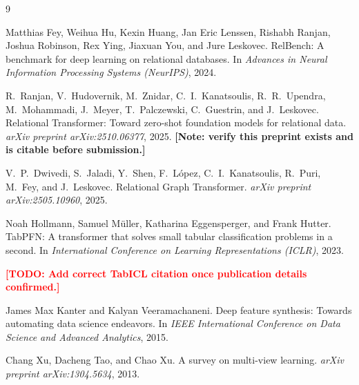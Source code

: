 \documentclass[11pt]{article}
\newcommand{\todo}[1]{\textcolor{red}{\textbf{[TODO: #1]}}}
\begin{document}

\begin{thebibliography}{9}

Matthias Fey, Weihua Hu, Kexin Huang, Jan Eric Lenssen, Rishabh Ranjan,
Joshua Robinson, Rex Ying, Jiaxuan You, and Jure Leskovec.
\newblock RelBench: A benchmark for deep learning on relational databases.
\newblock In \emph{Advances in Neural Information Processing Systems
  (NeurIPS)}, 2024.

R.~Ranjan, V.~Hudovernik, M.~Znidar, C.~I.~Kanatsoulis,
R.~R.~Upendra, M.~Mohammadi, J.~Meyer, T.~Palczewski, C.~Guestrin,
and J.~Leskovec.
\newblock Relational Transformer: Toward zero-shot foundation models for
  relational data.
\newblock \emph{arXiv preprint arXiv:2510.06377}, 2025.
\newblock \textbf{[Note: verify this preprint exists and is citable before
  submission.]}

V.~P.~Dwivedi, S.~Jaladi, Y.~Shen, F.~L\'opez, C.~I.~Kanatsoulis,
R.~Puri, M.~Fey, and J.~Leskovec.
\newblock Relational Graph Transformer.
\newblock \emph{arXiv preprint arXiv:2505.10960}, 2025.

Noah Hollmann, Samuel M\"uller, Katharina Eggensperger, and Frank Hutter.
\newblock TabPFN: A transformer that solves small tabular classification
  problems in a second.
\newblock In \emph{International Conference on Learning Representations
  (ICLR)}, 2023.

\todo{Add correct TabICL citation once publication details confirmed.}

James Max Kanter and Kalyan Veeramachaneni.
\newblock Deep feature synthesis: Towards automating data science endeavors.
\newblock In \emph{IEEE International Conference on Data Science and Advanced
  Analytics}, 2015.

Chang Xu, Dacheng Tao, and Chao Xu.
\newblock A survey on multi-view learning.
\newblock \emph{arXiv preprint arXiv:1304.5634}, 2013.

\end{thebibliography}
\end{document}

